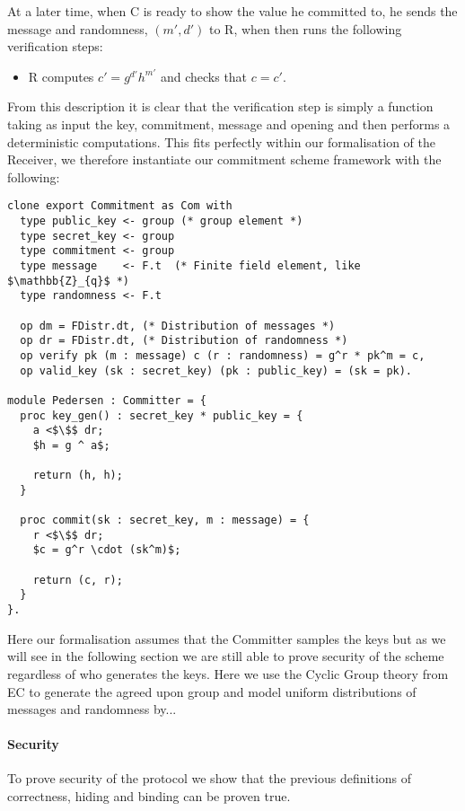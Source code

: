At a later time, when C is ready to show the value he committed to, he sends the
message and randomness, $(m',d')$ to R, when then runs the following
verification steps:
\begin{itemize}
  \item R computes $c' = g^{d'}h^{m'}$ and checks that $c = c'$.
\end{itemize}

From this description it is clear that the verification step is simply a
function taking as input the key, commitment, message and opening and then performs a
deterministic computations. This fits perfectly within our formalisation of the
Receiver, we therefore instantiate our commitment scheme framework with the
following:

\begin{lstlisting}[mathescape,label=lst:commitment:pedersen,caption=Pedersen instantiation]
clone export Commitment as Com with
  type public_key <- group (* group element *)
  type secret_key <- group
  type commitment <- group
  type message    <- F.t  (* Finite field element, like $\mathbb{Z}_{q}$ *)
  type randomness <- F.t

  op dm = FDistr.dt, (* Distribution of messages *)
  op dr = FDistr.dt, (* Distribution of randomness *)
  op verify pk (m : message) c (r : randomness) = g^r * pk^m = c,
  op valid_key (sk : secret_key) (pk : public_key) = (sk = pk).

module Pedersen : Committer = {
  proc key_gen() : secret_key * public_key = {
    a <$\$$ dr;
    $h = g ^ a$;

    return (h, h);
  }

  proc commit(sk : secret_key, m : message) = {
    r <$\$$ dr;
    $c = g^r \cdot (sk^m)$;

    return (c, r);
  }
}.

\end{lstlisting}

Here our formalisation assumes that the Committer samples the keys but as we
will see in the following section we are still able to prove security of the
scheme regardless of who generates the keys.
Here we use the Cyclic Group theory from EC to generate the agreed upon group
and model uniform distributions of messages and randomness by...

\paragraph{Security}
To prove security of the protocol we show that the previous definitions of
correctness, hiding and binding can be proven true.

